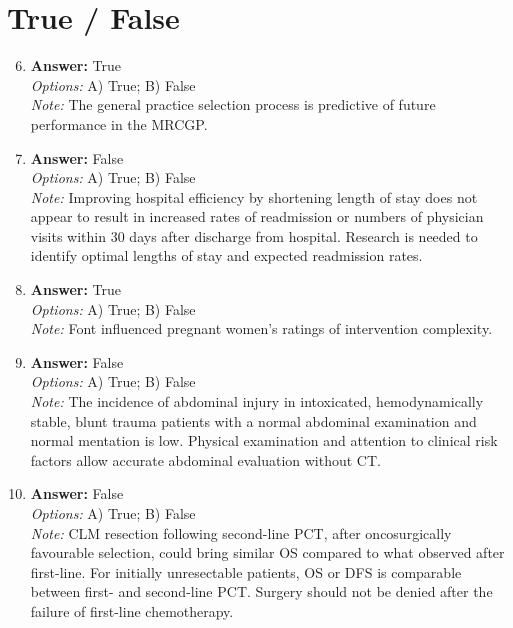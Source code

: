\documentclass[12pt]{article}
\begin{document}
\section*{True / False}
\begin{enumerate}[label=\arabic*.]
\setcounter{enumi}{5}
\item \textbf{Answer:} True
\\ \textit{Options:} A) True; B) False
\\ \textit{Note:} The general practice selection process is predictive of future performance in the MRCGP.
\item \textbf{Answer:} False
\\ \textit{Options:} A) True; B) False
\\ \textit{Note:} Improving hospital efficiency by shortening length of stay does not appear to result in increased rates of readmission or numbers of physician visits within 30 days after discharge from hospital. Research is needed to identify optimal lengths of stay and expected readmission rates.
\item \textbf{Answer:} True
\\ \textit{Options:} A) True; B) False
\\ \textit{Note:} Font influenced pregnant women's ratings of intervention complexity.
\item \textbf{Answer:} False
\\ \textit{Options:} A) True; B) False
\\ \textit{Note:} The incidence of abdominal injury in intoxicated, hemodynamically stable, blunt trauma patients with a normal abdominal examination and normal mentation is low. Physical examination and attention to clinical risk factors allow accurate abdominal evaluation without CT.
\item \textbf{Answer:} False
\\ \textit{Options:} A) True; B) False
\\ \textit{Note:} CLM resection following second-line PCT, after oncosurgically favourable selection, could bring similar OS compared to what observed after first-line. For initially unresectable patients, OS or DFS is comparable between first- and second-line PCT. Surgery should not be denied after the failure of first-line chemotherapy.
\end{enumerate}
\end{document}
